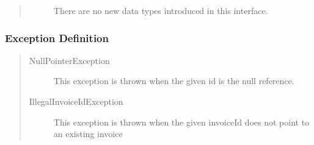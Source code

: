 \begin{quote}
	\begin{description}
		\item[]There are no new data types introduced in this interface. 
	\end{description} 
\end{quote}

\subsubsection{Exception Definition} 

\begin{quote}
	\begin{description}
		\item[NullPointerException] This exception is thrown when the given id is the
		null reference.
		\item[IllegalInvoiceIdException] This exception is thrown when the given
		invoiceId does not point to an existing invoice
	\end{description} 
\end{quote}